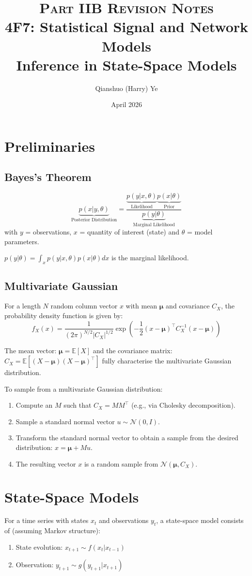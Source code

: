 \documentclass[12pt]{article}
\title{
    {\scshape  Part IIB Revision Notes} \\ 
    \vspace{0.5em}
    \textbf{4F7: Statistical Signal and Network Models} \\ 
    Inference in State-Space Models}
\author{Qianshuo (Harry) Ye}
\date{April 2026}
\begin{document}
\maketitle

\section*{Preliminaries}
\subsection*{Bayes's Theorem}
$$
\underbrace{p(x|y, \theta)}_{\text{Posterior Distribution}} = \frac{\underbrace{p(y | x, \theta)}_{\text{Likelihood}} \underbrace{p(x|\theta)}_{\text{Prior}}}{\underbrace{p(y|\theta)}_{\text{Marginal Likelihood}}}
$$
with $y$ = observations, $x$ = quantity of interest (state) and $\theta$ = model parameters.

${p(y|\theta) = \int_x p(y|x, \theta) p(x|\theta) dx}$ is the marginal likelihood.

\subsection*{Multivariate Gaussian}
For a length $N$ random column vector $x$ with mean $\boldsymbol{\mu}$ and covariance $C_X$, the probability density function is given by:
$$
f_X(x) = \frac{1}{(2\pi)^{N/2} |C_X|^{1/2}} \exp\left(-\frac{1}{2}(x-\boldsymbol{\mu})^\top C_X^{-1} (x-\boldsymbol{\mu})\right)
$$

The mean vector: $\boldsymbol{\mu} = \mathbb{E}[X]$ and the covariance matrix: $C_X = \mathbb{E}[(X-\boldsymbol{\mu})(X-\boldsymbol{\mu})^\top]$ fully characterise the multivariate Gaussian distribution.

To sample from a multivariate Gaussian distribution:
\begin{enumerate}
    \item Compute an $M$ such that $C_X = MM^\top$ (e.g., via Cholesky decomposition).
    \item Sample a standard normal vector $u \sim \mathcal{N}(0, I)$.
    \item Transform the standard normal vector to obtain a sample from the desired distribution: $x = \boldsymbol{\mu} + Mu$.
    \item The resulting vector $x$ is a random sample from $\mathcal{N}(\boldsymbol{\mu}, C_X)$.
\end{enumerate}

\section{State-Space Models}
For a time series with states $x_t$ and observations $y_t$, a state-space model consists of (assuming Markov structure):
\begin{enumerate}
    \item State evolution: $x_{t+1} \sim f(x_t | x_{t-1})$
    \item Observation: $y_{t+1} \sim g(y_{t+1} | x_{t+1})$
\end{enumerate}
\end{document}
